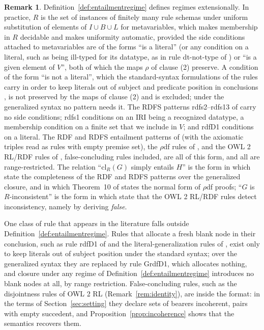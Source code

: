 \documentclass[12pt]{article}
\theoremstyle{definition}
\newtheorem{remark}{Remark}
\newcommand{\cl}{\mathrm{cl}}   %
\begin{document}
\begin{remark}
\label{rem:regimeschemas}
Definition~\ref{def:entailmentregime} defines regimes extensionally. In practice, $R$ is the set of instances of finitely many rule schemas under uniform substitution of elements of $I \cup B \cup L$ for metavariables, which makes membership in $R$ decidable and makes uniformity automatic, provided the side conditions attached to metavariables are of the forms ``is a literal'' (or any condition on a literal, such as being ill-typed for its datatype, as in rule dt-not-type of \citet{motik2012owl}) or ``is a given element of $V$'', both of which the maps $\rho$ of clause (2) preserve. A condition of the form ``is not a literal'', which the standard-syntax formulations of the rules carry in order to keep literals out of subject and predicate position in conclusions \citep{terhorst2005completeness}, is not preserved by the maps of clause (2) and is excluded; under the generalized syntax no pattern needs it. The RDFS patterns rdfs2--rdfs13 of \citet[\S 9.2.1]{hayes2014rdf} carry no side conditions; rdfs1 conditions on an IRI being a recognized datatype, a membership condition on a finite set that we include in $V$; and rdfD1 conditions on a literal. The RDF and RDFS entailment patterns of \citet[\S 9.2]{hayes2014rdf} (with the axiomatic triples read as rules with empty premise set), the $\rho$df rules of \citet{munoz2009simple}, and the OWL 2 RL/RDF rules of \citet{motik2012owl}, false-concluding rules included, are all of this form, and all are range-restricted. The relation ``$\cl_R(G)$ simply entails $H$'' is the form in which \citet{hayes2014rdf} state the completeness of the RDF and RDFS patterns over the generalized closure, and in which Theorem~10 of \citet{munoz2009simple} states the normal form of $\rho$df proofs; ``$G$ is $R$-inconsistent'' is the form in which \citet{motik2012owl} state that the OWL 2 RL/RDF rules detect inconsistency, namely by deriving \emph{false}.

One class of rule that appears in the literature falls outside Definition~\ref{def:entailmentregime}. Rules that allocate a fresh blank node in their conclusion, such as rule rdfD1 of \citet{hayes2014rdf} and the literal-generalization rules of \citet{terhorst2005completeness}, exist only to keep literals out of subject position under the standard syntax; over the generalized syntax they are replaced by rule GrdfD1, which allocates nothing, and closure under any regime of Definition~\ref{def:entailmentregime} introduces no blank nodes at all, by range restriction. False-concluding rules, such as the disjointness rules of OWL 2 RL (Remark~\ref{rem:identity}), are inside the format: in the terms of Section~\ref{sec:setting} they declare sets of bearers incoherent, pairs with empty succedent, and Proposition~\ref{prop:incoherence} shows that the semantics recovers them.
\end{remark}
\end{document}
